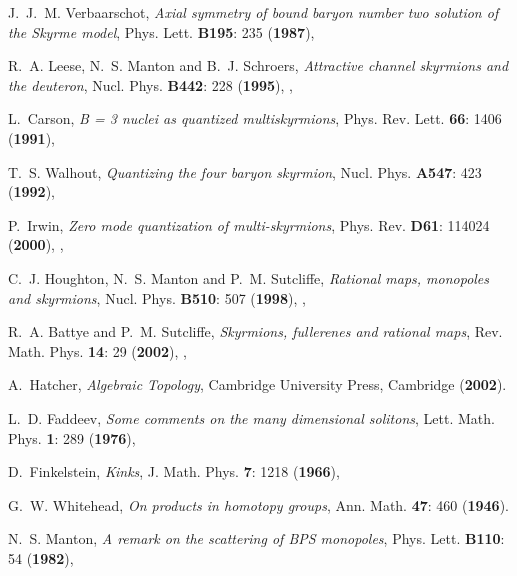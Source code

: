 \documentclass[a4paper,12pt]{article}
\begin{document}
\begin{small}
\begin{thebibliography}{10}
J.~J.~M. Verbaarschot, {\em Axial symmetry of bound baryon number two solution
  of the {S}kyrme model\/}, Phys. Lett. {\bf B195}: 235 ({\bf 1987}),

R.~A. Leese, N.~S. Manton and B.~J. Schroers, {\em Attractive channel skyrmions
  and the deuteron\/}, Nucl. Phys. {\bf B442}: 228 ({\bf 1995}),
  {},

L.~Carson, {\em B = 3 nuclei as quantized multiskyrmions\/}, Phys. Rev. Lett.
  {\bf 66}: 1406 ({\bf 1991}),

T.~S. Walhout, {\em Quantizing the four baryon skyrmion\/}, Nucl. Phys. {\bf
  A547}: 423 ({\bf 1992}),

P.~Irwin, {\em Zero mode quantization of multi-skyrmions\/}, Phys. Rev. {\bf
  D61}: 114024 ({\bf 2000}), {},

C.~J. Houghton, N.~S. Manton and P.~M. Sutcliffe, {\em Rational maps, monopoles
  and skyrmions\/}, Nucl. Phys. {\bf B510}: 507 ({\bf 1998}),
  {},

R.~A. Battye and P.~M. Sutcliffe, {\em Skyrmions, fullerenes and rational
  maps\/}, Rev. Math. Phys. {\bf 14}: 29 ({\bf 2002}),
  {},

A.~Hatcher, {\em Algebraic Topology\/}, Cambridge University Press, Cambridge
 ({\bf 2002}).

L.~D. Faddeev, {\em Some comments on the many dimensional solitons\/}, Lett.
  Math. Phys. {\bf 1}: 289 ({\bf 1976}),

D.~Finkelstein, {\em Kinks\/}, J. Math. Phys. {\bf 7}: 1218 ({\bf 1966}),

G.~W. Whitehead, {\em On products in homotopy groups\/}, Ann. Math. {\bf 47}:
  460
 ({\bf 1946}).

N.~S. Manton, {\em A remark on the scattering of {{BPS}} monopoles\/}, Phys.
  Lett. {\bf B110}: 54 ({\bf 1982}),


\end{thebibliography}
\end{small}
\end{document}
